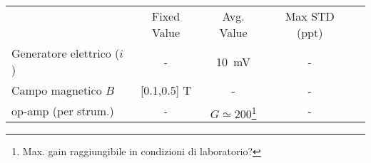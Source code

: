     \begin{tabular}{lcccc}
        \toprule
        & Fixed Value & Avg. Value & Max STD (ppt)\\
        \colrule
        Generatore elettrico ($i$) & - & \SI{10}{\milli\volt} & - \\
        Campo magnetico $B$ & [0.1,0.5] \si{\tesla} & - & - \\
        op-amp (per strum.) & - & $G\simeq 200$\footnote{Max. gain raggiungibile in condizioni di laboratorio?} & - \\
        \toprule
    \end{tabular}
